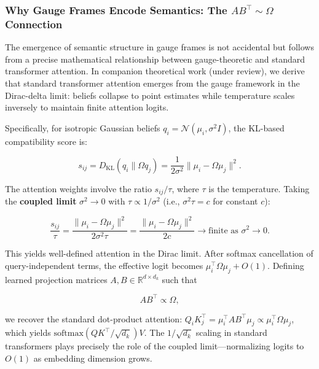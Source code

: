 \documentclass[twoside,11pt]{article}
\begin{document}
\subsubsection{Why Gauge Frames Encode Semantics: The $AB^\top \sim \Omega$ Connection}
\label{sec:ab_omega}

The emergence of semantic structure in gauge frames is not accidental but follows from a precise mathematical relationship between gauge-theoretic and standard transformer attention. In companion theoretical work (under review), we derive that standard transformer attention emerges from the gauge framework in the Dirac-delta limit: beliefs collapse to point estimates while temperature scales inversely to maintain finite attention logits.

Specifically, for isotropic Gaussian beliefs $q_i = \mathcal{N}(\mu_i, \sigma^2 I)$, the KL-based compatibility score is:

\begin{equation}
s_{ij} = D_{\mathrm{KL}}(q_i \| \Omega q_j) = \frac{1}{2\sigma^2}\|\mu_i - \Omega\mu_j\|^2.
\end{equation}

The attention weights involve the ratio $s_{ij}/\tau$, where $\tau$ is the temperature. Taking the \textbf{coupled limit} $\sigma^2 \to 0$ with $\tau \propto 1/\sigma^2$ (i.e., $\sigma^2 \tau = c$ for constant $c$):

\begin{equation}
\frac{s_{ij}}{\tau} = \frac{\|\mu_i - \Omega\mu_j\|^2}{2\sigma^2 \tau} = \frac{\|\mu_i - \Omega\mu_j\|^2}{2c} \to \text{finite as } \sigma^2 \to 0.
\end{equation}

This yields well-defined attention in the Dirac limit. After softmax cancellation of query-independent terms, the effective logit becomes $\mu_i^\top \Omega \mu_j + O(1)$. Defining learned projection matrices $A, B \in \mathbb{R}^{d \times d_k}$ such that

\begin{equation}
AB^\top \propto \Omega,
\label{eq:ab_omega}
\end{equation}

we recover the standard dot-product attention: $Q_i K_j^\top = \mu_i^\top A B^\top \mu_j \propto \mu_i^\top \Omega \mu_j$, which yields $\mathrm{softmax}(QK^\top/\sqrt{d_k})V$. The $1/\sqrt{d_k}$ scaling in standard transformers plays precisely the role of the coupled limit---normalizing logits to $O(1)$ as embedding dimension grows.
\end{document}
